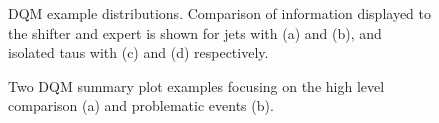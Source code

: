 \begin{figure}[htbp]
{    }
  \caption{DQM example distributions. Comparison of information displayed to the shifter and expert is shown for jets with (a) and (b), and isolated taus with (c) and (d) respectively.}
  \label{fig:dqm_plots}
\end{figure}


\begin{figure}[htbp]
  \centering
  \caption{Two DQM summary plot examples focusing on the high level comparison (a) and problematic events (b).}
  \label{fig:dqm_plots2}
\end{figure}

